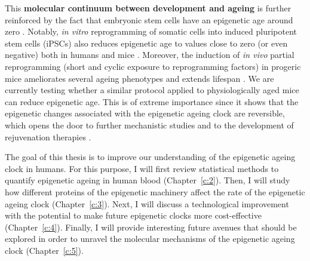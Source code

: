 This \textbf{molecular continuum between development and ageing} is further reinforced by the fact that embryonic stem cells have an epigenetic age around zero \citep{Horvath2013}. Notably, \textit{in vitro} reprogramming of somatic cells into induced pluripotent stem cells (\acrshort{iPSCs}) also reduces epigenetic age to values close to zero (or even negative) both in humans \citep{Horvath2013} and mice \citep{Petkovich2017,Meer2018}. Moreover, the induction of \textit{in vivo} partial reprogramming (short and cyclic exposure to reprogramming factors) in progeric mice ameliorates several ageing phenotypes and extends lifespan \citep{Ocampo2016}. We are currently testing whether a similar protocol applied to physiologically aged mice can reduce epigenetic age. This is of extreme importance since it shows that the epigenetic changes associated with the epigenetic ageing clock are reversible, which opens the door to further mechanistic studies and to the development of rejuvenation therapies \citep{Rando2012,Olova2019,Mahmoudi2019,Sarkar2019}.

\bigskip

The goal of this thesis is to improve our understanding of the epigenetic ageing clock in humans. For this purpose, I will first review statistical methods to quantify epigenetic ageing in human blood (Chapter~\ref{c:2}). Then, I will study how different proteins of the epigenetic machinery affect the rate of the epigenetic ageing clock (Chapter~\ref{c:3}). Next, I will discuss a technological improvement with the potential to make future epigenetic clocks more cost-effective (Chapter~\ref{c:4}). Finally, I will provide interesting future avenues that should be explored in order to unravel the molecular mechanisms of the epigenetic ageing clock (Chapter~\ref{c:5}). 
